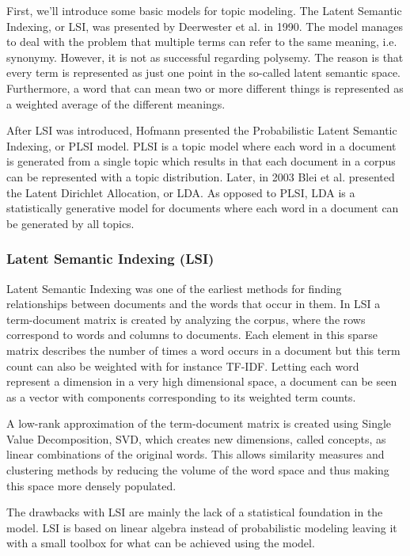 \documentclass[12pt]{report}
\begin{document}
First, we’ll introduce some basic models for topic modeling. The Latent Semantic
Indexing, or LSI, was presented by Deerwester et al. in 1990. The model manages
to deal with the problem that multiple terms can refer to the same meaning,
i.e. synonymy. However, it is not as successful regarding polysemy. The reason
is that every term is represented as just one point in the so-called latent
semantic space. Furthermore, a word that can mean two or more different things
is represented as a weighted average of the different meanings.
 
After LSI was introduced, Hofmann presented the Probabilistic Latent Semantic
Indexing, or PLSI model. PLSI is a topic model where each word in a
document is generated from a single topic which results in that each document
in a corpus can be represented with a topic distribution. Later, in 2003 Blei et
al. presented the Latent Dirichlet Allocation, or LDA. As opposed to PLSI, LDA
is a statistically generative model for documents where each word in a document
can be generated by all topics.

\subsubsection{Latent Semantic Indexing (LSI)}

Latent Semantic Indexing was one of the earliest methods for finding
relationships between documents and the words that occur in them.\cite{Deerwester90indexingby} In LSI a
term-document matrix is created by analyzing the corpus, where the rows
correspond to words and columns to documents. Each element in this sparse
matrix describes the number of times a word occurs in a document but this term
count can also be weighted with for instance TF-IDF. Letting each word
represent a dimension in a very high dimensional space, a document can be seen
as a vector with components corresponding to its weighted term counts.
\cite{Salton:1988:TAA:54259.54260}

A low-rank approximation of the term-document matrix is created using Single
Value Decomposition, SVD, which creates new dimensions, called concepts, as
linear combinations of the original words. This allows similarity measures and
clustering methods by reducing the volume of the word space and thus making
this space more densely populated.

The drawbacks with LSI are mainly the lack of a statistical foundation in the
model. LSI is based on linear algebra instead of probabilistic modeling leaving
it with a small toolbox for what can be achieved using the model.
	
\end{document}
